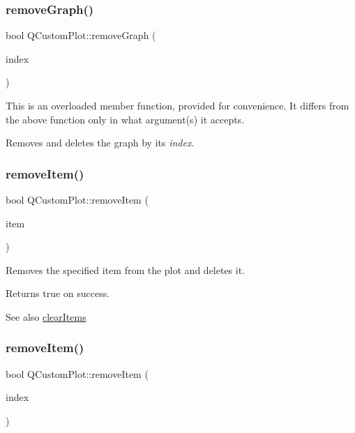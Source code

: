 \subsubsection{\texorpdfstring{removeGraph()}{removeGraph()}\hspace{0.1cm}{\footnotesize\ttfamily [2/2]}}
{\footnotesize\ttfamily bool Q\+Custom\+Plot\+::remove\+Graph (\begin{DoxyParamCaption}\item[{int}]{index }\end{DoxyParamCaption})}

This is an overloaded member function, provided for convenience. It differs from the above function only in what argument(s) it accepts.

Removes and deletes the graph by its {\itshape index}. \mbox{\label{class_q_custom_plot_ae04446557292551e8fb6e2c106e1848d}} 
\subsubsection{\texorpdfstring{removeItem()}{removeItem()}\hspace{0.1cm}{\footnotesize\ttfamily [1/2]}}
{\footnotesize\ttfamily bool Q\+Custom\+Plot\+::remove\+Item (\begin{DoxyParamCaption}\item[{\mbox{\hyperlink{class_q_c_p_abstract_item}{Q\+C\+P\+Abstract\+Item}} $\ast$}]{item }\end{DoxyParamCaption})}

Removes the specified item from the plot and deletes it.

Returns true on success.

\begin{DoxySeeAlso}{See also}
\mbox{\hyperlink{class_q_custom_plot_abdfd07d4f0591d0cf967f85013fd3645}{clear\+Items}} 
\end{DoxySeeAlso}
\mbox{\label{class_q_custom_plot_abcfdda3d601c0441cab136137d715dea}} 
\subsubsection{\texorpdfstring{removeItem()}{removeItem()}\hspace{0.1cm}{\footnotesize\ttfamily [2/2]}}
{\footnotesize\ttfamily bool Q\+Custom\+Plot\+::remove\+Item (\begin{DoxyParamCaption}\item[{int}]{index }\end{DoxyParamCaption})}

